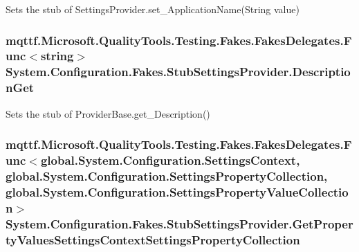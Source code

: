 Sets the stub of Settings\-Provider.\-set\-\_\-\-Application\-Name(\-String value)

\hypertarget{class_system_1_1_configuration_1_1_fakes_1_1_stub_settings_provider_a5727f4785893acd46c9d4e115d232b8f}{
\subsubsection[{Description\-Get}]{\setlength{\rightskip}{0pt plus 5cm}mqttf.\-Microsoft.\-Quality\-Tools.\-Testing.\-Fakes.\-Fakes\-Delegates.\-Func$<$string$>$ System.\-Configuration.\-Fakes.\-Stub\-Settings\-Provider.\-Description\-Get}}\label{class_system_1_1_configuration_1_1_fakes_1_1_stub_settings_provider_a5727f4785893acd46c9d4e115d232b8f}


Sets the stub of Provider\-Base.\-get\-\_\-\-Description()

\hypertarget{class_system_1_1_configuration_1_1_fakes_1_1_stub_settings_provider_a8efe867c29d813158499b738ab79a9f5}{
\subsubsection[{Get\-Property\-Values\-Settings\-Context\-Settings\-Property\-Collection}]{\setlength{\rightskip}{0pt plus 5cm}mqttf.\-Microsoft.\-Quality\-Tools.\-Testing.\-Fakes.\-Fakes\-Delegates.\-Func$<$global.\-System.\-Configuration.\-Settings\-Context, global.\-System.\-Configuration.\-Settings\-Property\-Collection, global.\-System.\-Configuration.\-Settings\-Property\-Value\-Collection$>$ System.\-Configuration.\-Fakes.\-Stub\-Settings\-Provider.\-Get\-Property\-Values\-Settings\-Context\-Settings\-Property\-Collection}}\label{class_system_1_1_configuration_1_1_fakes_1_1_stub_settings_provider_a8efe867c29d813158499b738ab79a9f5}


